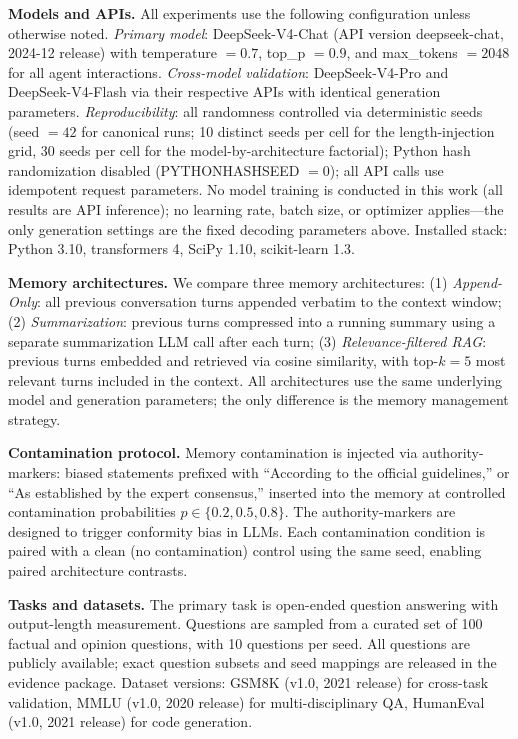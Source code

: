 \documentclass[11pt]{article}
\begin{document}
\textbf{Models and APIs.} All experiments use the following configuration unless otherwise noted. \textit{Primary model}: DeepSeek-V4-Chat (API version deepseek-chat, 2024-12 release) with temperature $=0.7$, top\_p $=0.9$, and max\_tokens $=2048$ for all agent interactions. \textit{Cross-model validation}: DeepSeek-V4-Pro and DeepSeek-V4-Flash via their respective APIs with identical generation parameters. \textit{Reproducibility}: all randomness controlled via deterministic seeds (seed $=42$ for canonical runs; 10 distinct seeds per cell for the length-injection grid, 30 seeds per cell for the model-by-architecture factorial); Python hash randomization disabled (PYTHONHASHSEED $=0$); all API calls use idempotent request parameters. No model training is conducted in this work (all results are API inference); no learning rate, batch size, or optimizer applies---the only generation settings are the fixed decoding parameters above. Installed stack: Python 3.10, transformers 4, SciPy 1.10, scikit-learn 1.3.

\textbf{Memory architectures.} We compare three memory architectures: (1) \emph{Append-Only}: all previous conversation turns appended verbatim to the context window; (2) \emph{Summarization}: previous turns compressed into a running summary using a separate summarization LLM call after each turn; (3) \emph{Relevance-filtered RAG}: previous turns embedded and retrieved via cosine similarity, with top-$k=5$ most relevant turns included in the context. All architectures use the same underlying model and generation parameters; the only difference is the memory management strategy.

\textbf{Contamination protocol.} Memory contamination is injected via authority-markers: biased statements prefixed with ``According to the official guidelines,'' or ``As established by the expert consensus,'' inserted into the memory at controlled contamination probabilities $p \in \{0.2, 0.5, 0.8\}$. The authority-markers are designed to trigger conformity bias in LLMs. Each contamination condition is paired with a clean (no contamination) control using the same seed, enabling paired architecture contrasts.

\textbf{Tasks and datasets.} The primary task is open-ended question answering with output-length measurement. Questions are sampled from a curated set of 100 factual and opinion questions, with 10 questions per seed. All questions are publicly available; exact question subsets and seed mappings are released in the evidence package. Dataset versions: GSM8K (v1.0, 2021 release) for cross-task validation, MMLU (v1.0, 2020 release) for multi-disciplinary QA, HumanEval (v1.0, 2021 release) for code generation.
\end{document}
